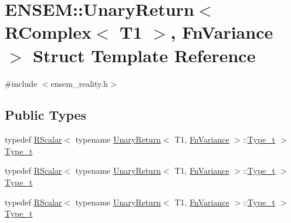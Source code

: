 \hypertarget{structENSEM_1_1UnaryReturn_3_01RComplex_3_01T1_01_4_00_01FnVariance_01_4}{}\section{E\+N\+S\+EM\+:\+:Unary\+Return$<$ R\+Complex$<$ T1 $>$, Fn\+Variance $>$ Struct Template Reference}
\label{structENSEM_1_1UnaryReturn_3_01RComplex_3_01T1_01_4_00_01FnVariance_01_4}


{\ttfamily \#include $<$ensem\+\_\+reality.\+h$>$}

\subsection*{Public Types}
\begin{DoxyCompactItemize}
\item 
typedef \mbox{\hyperlink{classENSEM_1_1RScalar}{R\+Scalar}}$<$ typename \mbox{\hyperlink{structENSEM_1_1UnaryReturn}{Unary\+Return}}$<$ T1, \mbox{\hyperlink{structENSEM_1_1FnVariance}{Fn\+Variance}} $>$\+::\mbox{\hyperlink{structENSEM_1_1UnaryReturn_3_01RComplex_3_01T1_01_4_00_01FnVariance_01_4_a85d25582f2c509cb70b5b53ff50ee7ce}{Type\+\_\+t}} $>$ \mbox{\hyperlink{structENSEM_1_1UnaryReturn_3_01RComplex_3_01T1_01_4_00_01FnVariance_01_4_a85d25582f2c509cb70b5b53ff50ee7ce}{Type\+\_\+t}}
\item 
typedef \mbox{\hyperlink{classENSEM_1_1RScalar}{R\+Scalar}}$<$ typename \mbox{\hyperlink{structENSEM_1_1UnaryReturn}{Unary\+Return}}$<$ T1, \mbox{\hyperlink{structENSEM_1_1FnVariance}{Fn\+Variance}} $>$\+::\mbox{\hyperlink{structENSEM_1_1UnaryReturn_3_01RComplex_3_01T1_01_4_00_01FnVariance_01_4_a85d25582f2c509cb70b5b53ff50ee7ce}{Type\+\_\+t}} $>$ \mbox{\hyperlink{structENSEM_1_1UnaryReturn_3_01RComplex_3_01T1_01_4_00_01FnVariance_01_4_a85d25582f2c509cb70b5b53ff50ee7ce}{Type\+\_\+t}}
\item 
typedef \mbox{\hyperlink{classENSEM_1_1RScalar}{R\+Scalar}}$<$ typename \mbox{\hyperlink{structENSEM_1_1UnaryReturn}{Unary\+Return}}$<$ T1, \mbox{\hyperlink{structENSEM_1_1FnVariance}{Fn\+Variance}} $>$\+::\mbox{\hyperlink{structENSEM_1_1UnaryReturn_3_01RComplex_3_01T1_01_4_00_01FnVariance_01_4_a85d25582f2c509cb70b5b53ff50ee7ce}{Type\+\_\+t}} $>$ \mbox{\hyperlink{structENSEM_1_1UnaryReturn_3_01RComplex_3_01T1_01_4_00_01FnVariance_01_4_a85d25582f2c509cb70b5b53ff50ee7ce}{Type\+\_\+t}}
\end{DoxyCompactItemize}


